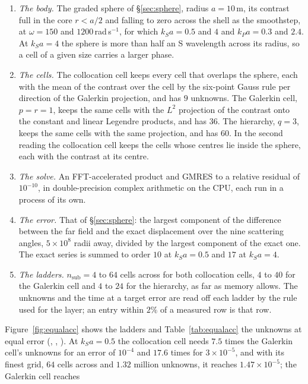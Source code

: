 \documentclass[11pt,a4paper]{article}
\begin{document}
\begin{enumerate}
\item \emph{The body.} The graded sphere of \S\ref{sec:sphere}, radius $a=10$\,m, its contrast full in
the core $r<a/2$ and falling to zero across the shell as the smoothstep, at $\omega=150$ and
$1200$\,rad\,s$^{-1}$, for which $k_Sa=0.5$ and $4$ and $k_Pa=0.3$ and $2.4$. At $k_Sa=4$ the sphere is
more than half an S wavelength across its radius, so a cell of a given size carries a larger phase.
\item \emph{The cells.} The collocation cell keeps every cell that overlaps the sphere, each with the mean
of the contrast over the cell by the six-point Gauss rule per direction of the Galerkin projection, and has
$9$ unknowns. The Galerkin cell, $p=r=1$, keeps the same cells with the $L^2$ projection of the contrast
onto the constant and linear Legendre products, and has $36$. The hierarchy, $q=3$, keeps the same cells
with the same projection, and has $60$. In the second reading the collocation cell keeps the cells whose
centres lie inside the sphere, each with the contrast at its centre.
\item \emph{The solve.} An FFT-accelerated product and GMRES to a relative residual of $10^{-10}$, in
double-precision complex arithmetic on the CPU, each run in a process of its own.
\item \emph{The error.} That of \S\ref{sec:sphere}: the largest component of the difference between the
far field and the exact displacement over the nine scattering angles, $5\times10^8$ radii away, divided
by the largest component of the exact one. The exact series is summed to order $10$ at $k_Sa=0.5$ and
$17$ at $k_Sa=4$.
\item \emph{The ladders.} $n_{\mathrm{sub}}=4$ to $64$ cells across for both collocation cells, $4$ to $40$
for the Galerkin cell and $4$ to $24$ for the hierarchy, as far as memory allows. The unknowns and the time
at a target error are read off each ladder by the rule used for the layer; an entry within $2\%$ of a
measured row is that row.
\end{enumerate}
Figure~\ref{fig:equalacc} shows the ladders and Table~\ref{tab:equalacc} the unknowns at equal error
(, ,
). At $k_Sa=0.5$ the collocation cell needs $7.5$ times the Galerkin
cell's unknowns for an error of $10^{-4}$ and $17.6$ times for $3\times10^{-5}$, and with its finest grid,
$64$ cells across and $1.32$ million unknowns, it reaches $1.47\times10^{-5}$; the Galerkin cell reaches
\end{document}
